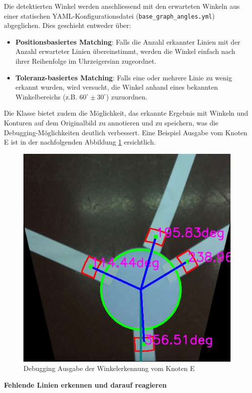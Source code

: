 Die detektierten Winkel werden anschliessend mit den erwarteten Winkeln aus einer statischen YAML-Konfigurationsdatei (\verb|base_graph_angles.yml|) abgeglichen. Dies geschieht entweder über:
\begin{itemize}
    \item \textbf{Positionsbasiertes Matching}: Falls die Anzahl erkannter Linien mit der Anzahl erwarteter Linien übereinstimmt, werden die Winkel einfach nach ihrer Reihenfolge im Uhrzeigersinn zugeordnet.
    \item \textbf{Toleranz-basiertes Matching}: Falls eine oder mehrere Linie zu wenig erkannt wurden, wird versucht, die Winkel anhand eines bekannten Winkelbereichs (z.B. $60^\circ \pm 30^\circ$) zuzuordnen.
\end{itemize}

Die Klasse bietet zudem die Möglichkeit, das erkannte Ergebnis mit Winkeln und Konturen auf dem Originalbild zu annotieren und zu speichern, was die Debugging-Möglichkeiten deutlich verbessert. Eine Beispiel Ausgabe vom Knoten E ist in der nachfolgenden Abbildung \ref{fig:angle-reader-debug-output} ersichtlich.

\begin{figure}[H]
    \centering
    \includegraphics[width=0.5\linewidth]{assets/IT/250525_204610_test_annotated_angles_of_E.jpg}
    \caption{Debugging Ausgabe der Winkelerkennung vom Knoten E}
    \label{fig:angle-reader-debug-output}
\end{figure}

\textbf{Fehlende Linien erkennen und darauf reagieren}

